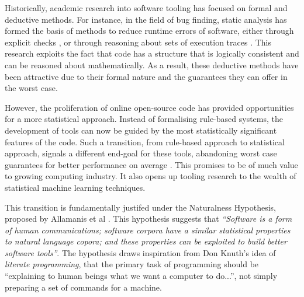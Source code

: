 

Historically, academic research into software tooling has focused on formal and deductive methods. 
For instance, in the field of bug finding, static analysis has formed the basis of methods to reduce runtime errors of software, either through explicit checks \cite{okada_combination_2007}, or through reasoning about sets of execution traces
\cite{bessey_few_2010}. 
This research exploits the fact that code has a structure that is logically consistent and can be reasoned about mathematically.
As a result, these deductive methods have been attractive due to their formal nature and the guarantees they can offer in the worst case.


However, the proliferation of online open-source code \cite{dyer_boa_2013} has provided opportunities for a more statistical approach. 
Instead of formalising rule-based systems, the development of tools can now be guided by the most statistically significant features of the code.
Such a transition, from rule-based approach to statistical approach, signals a different end-goal for these tools, abandoning worst case guarantees for better performance on average \cite{allamanis_survey_2017}. %
This promises to be of much value to growing computing industry. It also opens up tooling research to the wealth of statistical machine learning techniques.
 
This transition is fundamentally justifed under the Naturalness Hypothesis, proposed by Allamanis et al \cite{allamanis_survey_2017}. 
This hypothesis suggests that \textit{``Software is a form of human communications; software corpora have a similar statistical properties to natural language copora; and these properties can be exploited to build better software tools''}.\cite{allamanis_survey_2017} 
The hypothesis draws inspiration from Don Knuth's idea of \textit{literate programming}\cite{knuth_literate_1984}, that the primary task of programming should be ``explaining to human beings what we want a computer to do...''\cite{knuth_literate_1984}, not simply preparing a set of commands for a machine.

